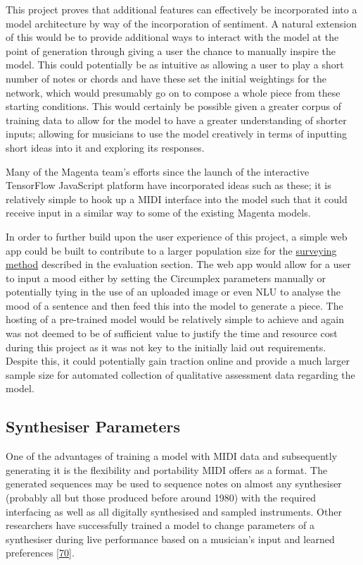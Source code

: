 \documentclass[12pt,]{article}
\begin{document}
This project proves that additional features can effectively be
incorporated into a model architecture by way of the incorporation of
sentiment. A natural extension of this would be to provide additional
ways to interact with the model at the point of generation through
giving a user the chance to manually inspire the model. This could
potentially be as intuitive as allowing a user to play a short number of
notes or chords and have these set the initial weightings for the
network, which would presumably go on to compose a whole piece from
these starting conditions. This would certainly be possible given a
greater corpus of training data to allow for the model to have a greater
understanding of shorter inputs; allowing for musicians to use the model
creatively in terms of inputting short ideas into it and exploring its
responses.

Many of the Magenta team's efforts since the launch of the interactive
TensorFlow JavaScript platform have incorporated ideas such as these; it
is relatively simple to hook up a MIDI interface into the model such
that it could receive input in a similar way to some of the existing
Magenta models.

In order to further build upon the user experience of this project, a
simple web app could be built to contribute to a larger population size
for the \protect\hyperlink{qualitativesurveryingmethod}{surveying
method} described in the evaluation section. The web app would allow for
a user to input a mood either by setting the Circumplex parameters
manually or potentially tying in the use of an uploaded image or even
NLU to analyse the mood of a sentence and then feed this into the model
to generate a piece. The hosting of a pre-trained model would be
relatively simple to achieve and again was not deemed to be of
sufficient value to justify the time and resource cost during this
project as it was not key to the initially laid out requirements.
Despite this, it could potentially gain traction online and provide a
much larger sample size for automated collection of qualitative
assessment data regarding the model.

\hypertarget{synthesiser-parameters}{%
\subsection{Synthesiser Parameters}\label{synthesiser-parameters}}

One of the advantages of training a model with MIDI data and
subsequently generating it is the flexibility and portability MIDI
offers as a format. The generated sequences may be used to sequence
notes on almost any synthesiser (probably all but those produced before
around 1980) with the required interfacing as well as all digitally
synthesised and sampled instruments. Other researchers have successfully
trained a model to change parameters of a synthesiser during live
performance based on a musician's input and learned preferences
{[}\protect\hyperlink{ref-sommer2014towards}{70}{]}.
\end{document}

